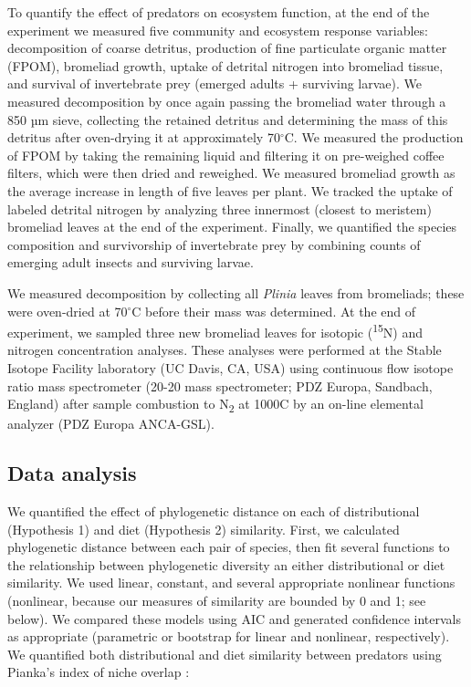 To quantify the effect of predators on ecosystem function, at the end of
the experiment we measured five community and ecosystem response
variables: decomposition of coarse detritus, production of fine
particulate organic matter (FPOM), bromeliad growth, uptake of detrital
nitrogen into bromeliad tissue, and survival of invertebrate prey
(emerged adults + surviving larvae). We measured decomposition by once
again passing the bromeliad water through a 850 µm sieve, collecting the
retained detritus and determining the mass of this detritus after
oven-drying it at approximately 70\(^\circ\)C. We measured the
production of FPOM by taking the remaining liquid and filtering it on
pre-weighed coffee filters, which were then dried and reweighed. We
measured bromeliad growth as the average increase in length of five
leaves per plant. We tracked the uptake of labeled detrital nitrogen by
analyzing three innermost (closest to meristem) bromeliad leaves at the
end of the experiment. Finally, we quantified the species composition
and survivorship of invertebrate prey by combining counts of emerging
adult insects and surviving larvae.

We measured decomposition by collecting all \emph{Plinia} leaves from
bromeliads; these were oven-dried at 70\(^\circ\)C before their mass was
determined. At the end of experiment, we sampled three new bromeliad
leaves for isotopic (\textsuperscript{15}N) and nitrogen concentration
analyses. These analyses were performed at the Stable Isotope Facility
laboratory (UC Davis, CA, USA) using continuous flow isotope ratio mass
spectrometer (20-20 mass spectrometer; PDZ Europa, Sandbach, England)
after sample combustion to N\textsubscript{2} at 1000C by an on-line
elemental analyzer (PDZ Europa ANCA-GSL).

\subsection{Data analysis}\label{data-analysis}

We quantified the effect of phylogenetic distance on each of
distributional (Hypothesis 1) and diet (Hypothesis 2) similarity. First,
we calculated phylogenetic distance between each pair of species, then
fit several functions to the relationship between phylogenetic diversity
an either distributional or diet similarity. We used linear, constant,
and several appropriate nonlinear functions (nonlinear, because our
measures of similarity are bounded by 0 and 1; see below). We compared
these models using AIC and generated confidence intervals as appropriate
(parametric or bootstrap for linear and nonlinear, respectively). We
quantified both distributional and diet similarity between predators
using Pianka's index of niche overlap \citep{Pianka1974}:

